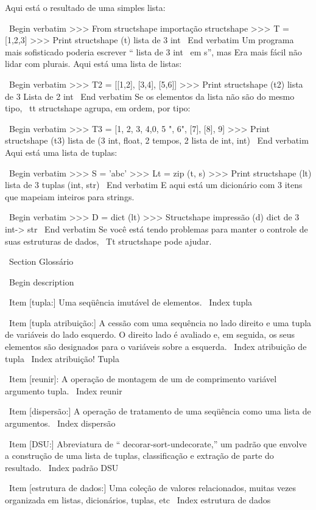 \documentclass[10pt]{book}
\begin{document}
\begin {itemize}
{{{{{{{{{Aqui está o resultado de uma simples lista:

\ Begin {verbatim}
>>> From structshape importação structshape
>>> T = [1,2,3]
>>> Print structshape (t)
lista de 3 int
\ End {verbatim}
%
Um programa mais sofisticado poderia escrever `` lista de 3 int {\ em s}'', mas
Era mais fácil não lidar com plurais. Aqui está uma lista de listas:

\ Begin {verbatim}
>>> T2 = [[1,2], [3,4], [5,6]]
>>> Print structshape (t2)
lista de 3 Lista de 2 int
\ End {verbatim}
%
Se os elementos da lista não são do mesmo tipo,
{\ tt structshape} agrupa, em ordem, por tipo:

\ Begin {verbatim}
>>> T3 = [1, 2, 3, 4,0, 5 ", 6", [7], [8], 9]
>>> Print structshape (t3)
lista de (3 int, float, 2 tempos, 2 lista de int, int)
\ End {verbatim}
%
Aqui está uma lista de tuplas:

\ Begin {verbatim}
>>> S = 'abc'
>>> Lt = zip (t, s)
>>> Print structshape (lt)
lista de 3 tuplas (int, str)
\ End {verbatim}
%
E aqui está um dicionário com 3 itens que mapeiam inteiros para strings.

\ Begin {verbatim}
>>> D = dict (lt) 
>>> Structshape impressão (d)
dict de 3 int-> str
\ End {verbatim}
%
Se você está tendo problemas para manter o controle de suas estruturas de dados,
{\ Tt structshape} pode ajudar.


\ Section {} Glossário

\ Begin {description}

\ Item [tupla:] Uma seqüência imutável de elementos.
\ Index {} tupla

\ Item [tupla atribuição:] A cessão com uma sequência no
lado direito e uma tupla de variáveis ​​do lado esquerdo. O direito
lado é avaliado e, em seguida, os seus elementos são designados para o
variáveis ​​sobre a esquerda.
\ Index {atribuição de tupla}
\ Index {atribuição! Tupla}

\ Item [reunir]: A operação de montagem de um de comprimento variável
argumento tupla.
\ Index {reunir}

\ Item [dispersão:] A operação de tratamento de uma seqüência como uma lista de
argumentos.
\ Index {dispersão}

\ Item [DSU:] Abreviatura de `` decorar-sort-undecorate,'' um
padrão que envolve a construção de uma lista de tuplas, classificação e
extração de parte do resultado.
\ Index {padrão DSU}

\ Item [estrutura de dados:] Uma coleção de valores relacionados, muitas vezes
organizada em listas, dicionários, tuplas, etc
\ Index {estrutura de dados}

}}}}}}}}}
\end{itemize}
\end{document}
